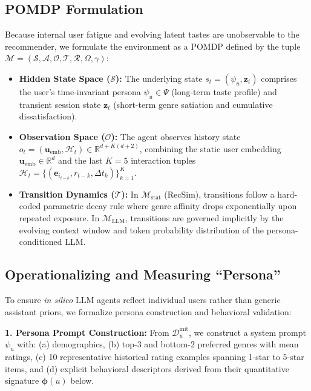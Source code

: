 \documentclass{article}
\begin{document}
\subsection{POMDP Formulation}
Because internal user fatigue and evolving latent tastes are unobservable to the recommender, we formulate the environment as a POMDP defined by the tuple $\mathcal{M} = (\mathcal{S}, \mathcal{A}, \mathcal{O}, \mathcal{T}, \mathcal{R}, \Omega, \gamma)$:
\begin{itemize}
    \item \textbf{Hidden State Space ($\mathcal{S}$):} The underlying state $s_t = (\psi_u, \bm{z}_t)$ comprises the user's time-invariant persona $\psi_u \in \Psi$ (long-term taste profile) and transient session state $\bm{z}_t$ (short-term genre satiation and cumulative dissatisfaction).
    \item \textbf{Observation Space ($\mathcal{O}$):} The agent observes history state $o_t = (\bm{u}_{\text{emb}}, \mathcal{H}_t) \in \mathbb{R}^{d + K(d+2)}$, combining the static user embedding $\bm{u}_{\text{emb}} \in \mathbb{R}^d$ and the last $K=5$ interaction tuples $\mathcal{H}_t = \{(\bm{e}_{i_{t-k}}, r_{t-k}, \Delta t_k)\}_{k=1}^K$.
    \item \textbf{Transition Dynamics ($\mathcal{T}$):} In $\mathcal{M}_{\text{stat}}$ (RecSim), transitions follow a hard-coded parametric decay rule where genre affinity drops exponentially upon repeated exposure. In $\mathcal{M}_{\text{LLM}}$, transitions are governed implicitly by the evolving context window and token probability distribution of the persona-conditioned LLM.
\end{itemize}

\subsection{Operationalizing and Measuring ``Persona''}
To ensure \textit{in silico} LLM agents reflect individual users rather than generic assistant priors, we formalize persona construction and behavioral validation:

\textbf{1. Persona Prompt Construction:} From $\mathcal{D}_{u}^{\text{init}}$, we construct a system prompt $\psi_u$ with: (a) demographics, (b) top-3 and bottom-2 preferred genres with mean ratings, (c) 10 representative historical rating examples spanning 1-star to 5-star items, and (d) explicit behavioral descriptors derived from their quantitative signature $\bm{\phi}(u)$ below.
\end{document}
